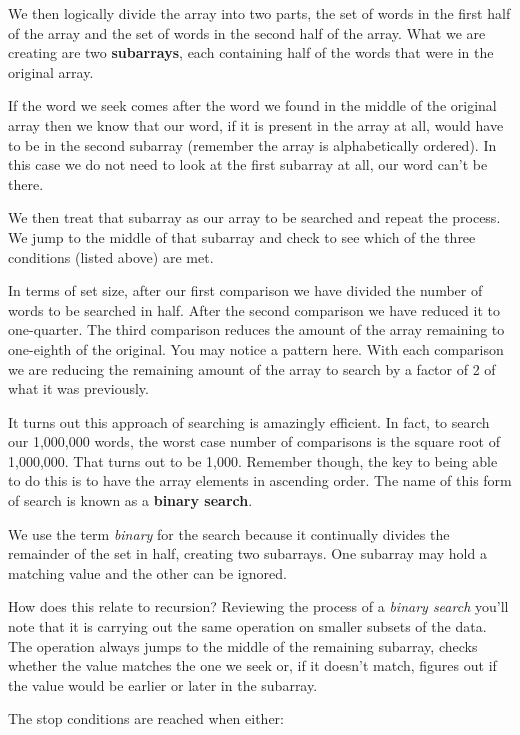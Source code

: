 We then logically divide the array into two parts, the set of words in the first half of the array and the set of words in the second half of the array. What we are creating are two \textbf{subarrays}, each containing half of the words that were in the original array. 

If the word we seek comes after the word we found in the middle of the original array then we know that our word, if it is present in the array at all, would have to be in the second subarray (remember the array is alphabetically ordered). In this case we do not need to look at the first subarray at all, our word can't be there.

We then treat that subarray as our array to be searched and repeat the process. We jump to the middle of that subarray and check to see which of the three conditions (listed above) are met.

In terms of set size, after our first comparison we have divided the number of words to be searched in half. After the second comparison we have reduced it to one-quarter. The third comparison reduces the amount of the array remaining to one-eighth of the original. You may notice a pattern here. With each comparison we are reducing the remaining amount of the array to search by a factor of 2 of what it was previously.

It turns out this approach of searching is amazingly efficient. In fact, to search our 1,000,000 words, the worst case number of comparisons is the square root of 1,000,000. That turns out to be 1,000. Remember though, the key to being able to do this is to have the array elements in ascending order. The name of this form of search is known as a \textbf{binary search}.


We use the term \textit{binary} for the search because it continually divides the remainder of the set in half, creating two subarrays. One subarray may hold a matching value and the other can be ignored.

How does this relate to recursion? Reviewing the process of a \textit{binary search} you'll note that it is carrying out the same operation on smaller subsets of the data. The operation always jumps to the middle of the remaining subarray, checks whether the value matches the one we seek or, if it doesn't match, figures out if the value would be earlier or later in the subarray.

The stop conditions are reached when either:

